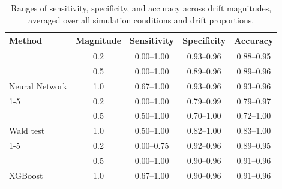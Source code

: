 \begin{table}[!h]
\centering
\caption{\label{tab:tab:boundary}Ranges of sensitivity, specificity, and accuracy across drift magnitudes, averaged over all simulation conditions and drift proportions.}
\centering
\begin{tabular}[t]{lcccc}
\toprule
Method & Magnitude & Sensitivity & Specificity & Accuracy\\
\midrule
 & 0.2 & 0.00--1.00 & 0.93--0.96 & 0.88--0.95\\

 & 0.5 & 0.00--1.00 & 0.89--0.96 & 0.89--0.96\\

\multirow{-3}{*}{\raggedright\arraybackslash Neural Network} & 1.0 & 0.67--1.00 & 0.93--0.96 & 0.93--0.96\\
\cmidrule{1-5}
 & 0.2 & 0.00--1.00 & 0.79--0.99 & 0.79--0.97\\

 & 0.5 & 0.50--1.00 & 0.70--1.00 & 0.72--1.00\\

\multirow{-3}{*}{\raggedright\arraybackslash Wald test} & 1.0 & 0.50--1.00 & 0.82--1.00 & 0.83--1.00\\
\cmidrule{1-5}
 & 0.2 & 0.00--0.75 & 0.92--0.96 & 0.89--0.95\\

 & 0.5 & 0.00--1.00 & 0.90--0.96 & 0.91--0.96\\

\multirow{-3}{*}{\raggedright\arraybackslash XGBoost} & 1.0 & 0.67--1.00 & 0.90--0.96 & 0.91--0.96\\
\bottomrule
\end{tabular}
\end{table}
